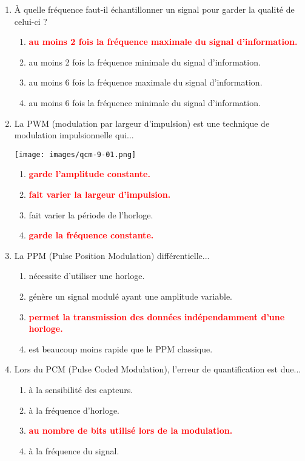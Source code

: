 \documentclass[a4paper]{article}
\begin{document}
\begin{enumerate}[label=Q\arabic*.]


\item À quelle fréquence faut-il échantillonner un signal pour garder la qualité de celui-ci ?
\begin{enumerate}
    \item \textcolor{red}{\textbf{au moins 2 fois la fréquence maximale du signal d'information.}}
    \item au moins 2 fois la fréquence minimale du signal d'information.
    \item au moins 6 fois la fréquence maximale du signal d'information.
    \item au moins 6 fois la fréquence minimale du signal d'information.
\end{enumerate}


\item La PWM (modulation par largeur d’impulsion) est une technique de modulation impulsionnelle qui...
\begin{center}
    \texttt{[image: images/qcm-9-01.png]}
\end{center}
\begin{enumerate}
    \item \textcolor{red}{\textbf{garde l’amplitude constante.}}
    \item \textcolor{red}{\textbf{fait varier la largeur d’impulsion.}}
    \item fait varier la période de l'horloge.
    \item \textcolor{red}{\textbf{garde la fréquence constante.}}
\end{enumerate}


\item La PPM (Pulse Position Modulation) différentielle...
\begin{enumerate}
    \item nécessite d'utiliser une horloge.
    \item génère un signal modulé ayant une amplitude variable.
    \item \textcolor{red}{\textbf{permet la transmission des données indépendamment d'une horloge.}}
    \item est beaucoup moins rapide que le PPM classique.
\end{enumerate}


\item Lors du PCM (Pulse Coded Modulation), l'erreur de quantification est due...
\begin{enumerate}
    \item à la sensibilité des capteurs.
    \item à la fréquence d'horloge.
    \item \textcolor{red}{\textbf{au nombre de bits utilisé lors de la modulation.}}
    \item à la fréquence du signal.
\end{enumerate}



\end{enumerate}
\end{document}
